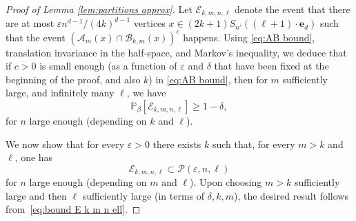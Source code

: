 \documentclass[11pt,a4paper]{article}
\numberwithin{equation}{section}
\theoremstyle{plain}
\theoremstyle{definition}
\begin{document}
\begin{proof}[Proof of Lemma \textup{\ref{lem:partitions approx}}]
Let $\mathcal{E}_{k,m,n,\ell}$ denote the event that there are at most $\varepsilon n^{d-1}/(4k)^{d-1}$ vertices $x\in (2k+1)S_{n'}((\ell+1)\cdot \mathbf{e}_d)$ such that the event $(\mathcal{A}_{m}(x)\cap \mathcal{B}_{k,m}(x))^c$ happens. Using \eqref{eq:AB bound}, translation invariance in the half-space, and Markov's inequality, we deduce that if $c>0$ is small enough (as a function of $\varepsilon$ and $\delta$ that have been fixed at the beginning of the proof, and also $k$) in \eqref{eq:AB bound}, then for $m$ sufficiently large, and infinitely many $\ell$, we have
\begin{equation}\label{eq:bound E k m n ell}
\mathbb{P}_{\beta}[\mathcal{E}_{k,m,n,\ell}]\geq 1-\delta,
\end{equation}
for $n$ large enough (depending on $k$ and $\ell$).

We now show that for every $\varepsilon>0$ there exists $k$ such that, for every $m>k$ and $\ell$, one has
\begin{equation}
    \mathcal{E}_{k,m,n,\ell}\subset \mathcal P(\varepsilon, n,\ell)
\end{equation}
for $n$ large enough (depending on $m$ and $\ell$). 
Upon choosing $m>k$ sufficiently large and then $\ell$ sufficiently large (in terms of $\delta,k,m$), 
the desired result follows from~\eqref{eq:bound E k m n ell}.


\end{proof}
\end{document}
